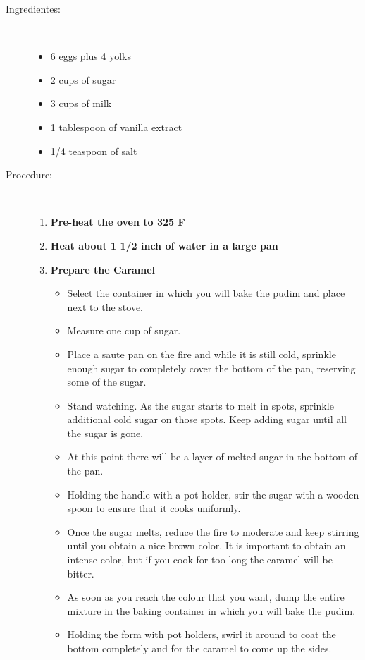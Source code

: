 \documentclass [11pt, letterpaper] {article}
\begin{document}
\begin{description}

\item[Ingredientes:]\ \\
	\begin{itemize}
	\item 6 eggs plus 4 yolks
	\item 2 cups of sugar 
	\item 3 cups of milk
	\item 1 tablespoon of vanilla extract
	\item 1/4 teaspoon of salt
	\end{itemize}

\item[Procedure:] \ \\
	\begin{enumerate}
	\item {\bf Pre-heat the oven to 325 F}
	\item {\bf Heat about 1 1/2 inch of water in a large pan}
	\item {\bf Prepare the Caramel}
	\begin{itemize}
	\item Select the container in which you will bake the pudim and place
next to the stove.
	\item Measure one cup of sugar.
	\item Place a saute pan on the fire and while it is still
cold, sprinkle enough sugar to completely cover the bottom of the pan, reserving some of the sugar.
	\item Stand watching. As the sugar starts to melt in spots,
sprinkle additional cold sugar on those spots. Keep adding sugar until
all the sugar is gone.
	\item At this point there will be a layer of melted sugar in
the bottom of the pan. 
	\item Holding the handle with a pot holder, stir the sugar
with a wooden spoon to ensure that it cooks uniformly.
	\item Once the sugar melts, reduce the fire to moderate and
keep stirring until you obtain a nice brown color. It is important to
obtain  an intense color, but if you cook for too long the caramel will be
bitter.
	\item As soon as you reach the colour that you want, dump the
entire mixture in the baking container in which you will bake the pudim. 
	\item Holding the form with pot holders, swirl it around to
coat the bottom completely and for the caramel to come up the sides.

\end{itemize}
\end{enumerate}
\end{description}
\end{document}
